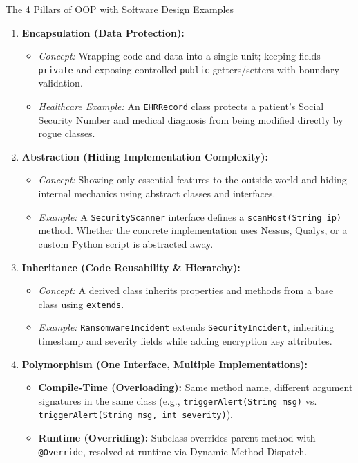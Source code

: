 \documentclass[11pt,a4paper]{article}
\begin{document}
\begin{techbox}{The 4 Pillars of OOP with Software Design Examples}
\begin{enumerate}
    \item \textbf{Encapsulation (Data Protection):}
    \begin{itemize}
        \item \textit{Concept:} Wrapping code and data into a single unit; keeping fields \texttt{private} and exposing controlled \texttt{public} getters/setters with boundary validation.
        \item \textit{Healthcare Example:} An \texttt{EHRRecord} class protects a patient's Social Security Number and medical diagnosis from being modified directly by rogue classes.
    \end{itemize}
    \item \textbf{Abstraction (Hiding Implementation Complexity):}
    \begin{itemize}
        \item \textit{Concept:} Showing only essential features to the outside world and hiding internal mechanics using abstract classes and interfaces.
        \item \textit{Example:} A \texttt{SecurityScanner} interface defines a \texttt{scanHost(String ip)} method. Whether the concrete implementation uses Nessus, Qualys, or a custom Python script is abstracted away.
    \end{itemize}
    \item \textbf{Inheritance (Code Reusability \& Hierarchy):}
    \begin{itemize}
        \item \textit{Concept:} A derived class inherits properties and methods from a base class using \texttt{extends}.
        \item \textit{Example:} \texttt{RansomwareIncident} extends \texttt{SecurityIncident}, inheriting timestamp and severity fields while adding encryption key attributes.
    \end{itemize}
    \item \textbf{Polymorphism (One Interface, Multiple Implementations):}
    \begin{itemize}
        \item \textbf{Compile-Time (Overloading):} Same method name, different argument signatures in the same class (e.g., \texttt{triggerAlert(String msg)} vs. \texttt{triggerAlert(String msg, int severity)}).
        \item \textbf{Runtime (Overriding):} Subclass overrides parent method with \texttt{@Override}, resolved at runtime via Dynamic Method Dispatch.
    \end{itemize}
\end{enumerate}
\end{techbox}
\end{document}
